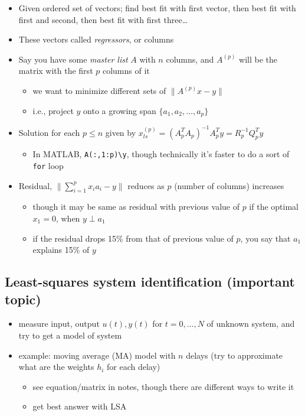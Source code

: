 \documentclass[10pt,letterpaper]{article}
\begin{document}
\begin{itemize}
\item Given ordered set of vectors; find best fit with first vector, then best fit with first and second, then best fit with first three\ldots{}
\item These vectors called \emph{regressors}, or columns
\item Say you have some \emph{master list} $A$ with $n$ columns, and $A ^{(p)}$ will be the matrix with the first $p$ columns of it

\begin{itemize}
\item we want to minimize different sets of $\| A ^{(p)} x-y \|$
\item i.e., project $y$ onto a growing span $\{a_1, a_2, ..., a_p\}$
\end{itemize}

\item Solution for each $p \le n$ given by $x _{ls} ^{(p)} = (A ^{T} _{p} A _{p} )^{-1} A _{p} ^{T} y = R ^{-1} _{p} Q ^{T} _{p} y$

\begin{itemize}
\item In MATLAB, \texttt{A(:,1:p)\textbackslash{}y}, though technically it's faster to do a sort of \texttt{for} loop
\end{itemize}

\item Residual, $\| \sum ^{p} _{i=1} x_i a_i -y \|$ reduces as $p$ (number of columns) increases

\begin{itemize}
\item though it may be same as residual with previous value of $p$ if the optimal $x_1=0$, when $y \perp a_1$
\item if the residual drops 15\% from that of previous value of $p$, you say that $a_1$ explains 15\% of $y$
\end{itemize}

\end{itemize}
\subsection{Least-squares system identification (important topic)}
\label{sec-5_3}

\begin{itemize}
\item measure input, output $u(t), y(t)$ for $t=0,...,N$ of unknown system, and try to get a model of system
\item example: moving average (MA) model with $n$ delays (try to approximate what are the weights $h_i$ for each delay)

\begin{itemize}
\item see equation/matrix in notes, though there are different ways to write it
\item get best answer with LSA
\end{itemize}

\end{itemize}
\end{document}
